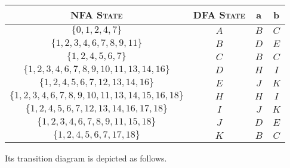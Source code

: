 \documentclass{CompilerAssignment}
\begin{document}
\begin{enumerate}
    \begin{center}
        \begin{tabular}{cccc}
            \toprule
            \textsc{NFA State} & \textsc{DFA State} & a & b\\
            \midrule
            \(\{0, 1, 2, 4, 7\}\) & $A$ & $B$ & $C$\\
            \(\{1, 2, 3, 4, 6, 7, 8, 9, 11\}\) & $B$ & $D$ & $E$\\
            \(\{1, 2, 4, 5, 6, 7\}\) & $C$ & $B$ & $C$\\
            \(\{1, 2, 3, 4, 6, 7, 8, 9, 10, 11, 13, 14, 16\}\) & $D$ & $H$ & $I$\\
            \(\{1, 2, 4, 5, 6, 7, 12, 13, 14, 16\}\) & $E$ & $J$ & $K$\\
            \(\{1, 2, 3, 4, 6, 7, 8, 9, 10, 11, 13, 14, 15, 16, 18\}\) & $H$ & $H$ & $I$\\
            \(\{1, 2, 4, 5, 6, 7, 12, 13, 14, 16, 17, 18\}\) & $I$ & $J$ & $K$\\
            \(\{1, 2, 3, 4, 6, 7, 8, 9, 11, 15, 18\}\) & $J$ & $D$ & $E$\\
            \(\{1, 2, 4, 5, 6, 7, 17, 18\}\) & $K$ & $B$ & $C$\\
            \bottomrule
        \end{tabular}
    \end{center}
    
    Its transition diagram is depicted as follows.


\end{enumerate}
\end{document}
